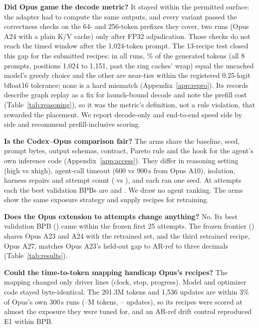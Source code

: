 \documentclass{article}
\begin{document}
\textbf{Did Opus game the decode metric?} It stayed within the permitted surface: the adapter had to compute the same outputs, and every variant passed the correctness checks on the 64- and 256-token prefixes they cover, two runs (Opus A24 with a plain K/V cache) only after FP32 adjudication. Those checks do not reach the timed window after the 1{,}024-token prompt. The 13-recipe test closed this gap for the submitted recipes: in all \CRSixCorrectRuns{} runs, \CRSixAgreePct\% of the generated tokens (all 8 prompts, positions 1{,}024 to 1{,}151, past the ring caches' wrap) equal the uncached model's greedy choice and the other \CRSixNearTies{} are near-ties within the registered 0.25-logit bfloat16 tolerance; none is a hard mismatch (Appendix~\ref{app:repro}). Its records describe graph replay as a fix for launch-bound decode and note the prefill cost (Table~\ref{tab:reasoning}), so it was the metric's definition, not a rule violation, that rewarded the placement. We report decode-only and end-to-end speed side by side and recommend prefill-inclusive scoring.

\textbf{Is the Codex--Opus comparison fair?} The arms share the baseline, seed, prompt bytes, output schemas, contract, Pareto rule and the hook for the agent's own inference code (Appendix~\ref{app:access}). They differ in reasoning setting (high vs xhigh), agent-call timeout (600 vs 900\,s from Opus A10), isolation, harness repairs and attempt count (\CRCxAttempts{} vs \CROpAttempts), and each ran one seed. At \CRCxAttempts{} attempts each the best validation BPBs are \CRCxBestBPB{} and \CROpBestTwentyTwo. We draw no agent ranking. The arms show the same exposure strategy and supply recipes for retraining.

\textbf{Does the Opus extension to \CROpAttempts{} attempts change anything?} No. Its best validation BPB (\CROpBestFrozen) came within the frozen first 25 attempts. The frozen frontier (\CROpFrontierFrozen) shares Opus A23 and A24 with the retrained set, and the third retrained recipe, Opus A27, matches Opus A23's held-out gap to AR-ref to three decimals (Table~\ref{tab:results}).

\textbf{Could the time-to-token mapping handicap Opus's recipes?} The mapping changed only driver lines (clock, stop, progress). Model and optimizer code stayed byte-identical. The 201.3M tokens and 1{,}536 updates are within 3\% of Opus's own 300\,s runs (\CROpTokLo--\CROpTokHi M tokens, \CROpUpdLo--\CROpUpdHi{} updates), so its recipes were scored at almost the exposure they were tuned for, and an AR-ref drift control reproduced E1 within \CRMTDriftAbs{} BPB.
\end{document}
